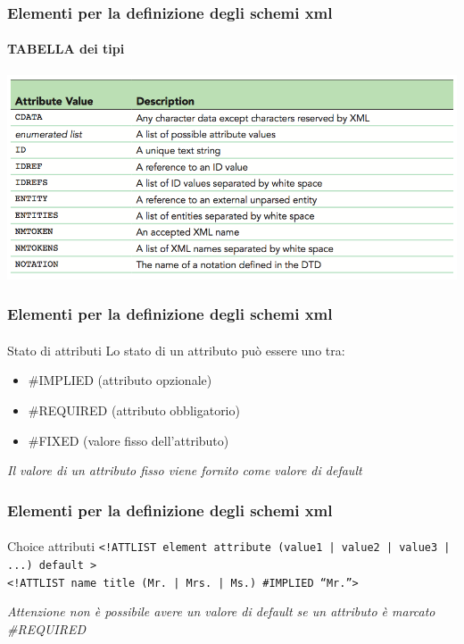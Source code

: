 \begin{frame}
    \frametitle{Elementi per la definizione degli schemi xml}
    \framesubtitle{TABELLA dei tipi}
    \addtocounter{nframe}{1}

    \begin{center}
        \includegraphics[width=.95\textwidth]{imgs/xml-TipiAttributoXML.png}
    \end{center}
\end{frame}


\begin{frame}
    \frametitle{Elementi per la definizione degli schemi xml}
    \framesubtitle{}
    \addtocounter{nframe}{1}

    \begin{block}{Stato di attributi}
        Lo stato di un attributo può essere uno tra:
        \begin{itemize}
            \item \#IMPLIED (attributo opzionale)
            \item \#REQUIRED (attributo obbligatorio)
            \item \#FIXED (valore fisso dell'attributo)
        \end{itemize}
    \end{block}
    \textit{Il valore di un attributo fisso viene fornito come valore di default}
\end{frame}


\begin{frame}
    \frametitle{Elementi per la definizione degli schemi xml}
    \framesubtitle{}
    \addtocounter{nframe}{1}

    \begin{block}{Choice attributi}
     \texttt{<!ATTLIST element attribute (value1 | value2 | value3 | ...) default >}
    \\\texttt{<!ATTLIST name title (Mr. | Mrs. | Ms.) \#IMPLIED ``Mr.''>}
    \end{block}
    \textit{Attenzione non è possibile avere un valore di default se un attributo è marcato \#REQUIRED}
\end{frame}

